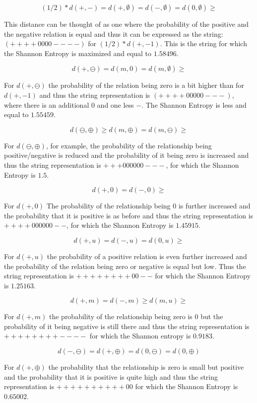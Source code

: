 \documentclass[12pt]{article}
\begin{document}
$$(1/2)*d(+, -) = d(+, \emptyset)= d(-, \emptyset) = d(0, \emptyset) \geq$$

This distance can be thought of as one where the probability of the positive and the negative relation is equal and thus it can be expressed as the string: $(++++0000----)$ for $(1/2)*d(+, -1)$. This is the string for which the Shannon Entropy is maximized and equal to $1.58496$. 

$$d(+, \ominus)=d(m, 0)=d(m, \emptyset) \geq $$

For $d(+, \ominus)$ the probability of the relation being zero is a bit higher than for $d(+, -1)$ and thus the string representation is $(++++00000---)$, where there is an additional $0$ and one less $-$. The Shannon Entropy is less and equal to $1.55459$.

$$d(\ominus, \oplus) \geq d(m, \oplus)=d(m, \ominus) \geq$$

For $d(\ominus, \oplus)$, for example, the probability of the relationship being positive/negative is reduced and the probability of it being zero is increased and thus the string representation is $+++000000---$, for which the Shannon Entropy is $1.5$. 

$$d(+, 0)=d(-, 0) \geq$$

For $d(+, 0)$ The probability of the relationship being $0$ is further increased and the probability that it is positive is as before and thus the string representation is $++++000000--$, for which the Shannon Entropy is $1.45915$. 

$$d(+, u)=d(-,u)=d(0, u) \geq$$

For $d(+, u)$ the probability of a positive relation is even further increased and the probability of the relation being zero or negative is equal but low. Thus the string representation is $++++++++00--$ for which the Shannon Entropy is $1.25163$. 

$$d(+, m)= d(-, m) \geq d(m , u) \geq$$

For $d(+, m)$ the probability of the relationship being zero is $0$ but the probability of it being negative is still there and thus the string representation is $++++++++----$ for which the Shannon entropy is $0.9183$.

$$d(-, \ominus)=d(+, \oplus)=d(0, \ominus)=d(0, \oplus)$$

For $d(+, \oplus)$ the probability that the relationship is zero is small but positive and the probability that it is positive is quite high and thus the string representation is $++++++++++00$ for which the Shannon Entropy is $0.65002$. 
\end{document}
